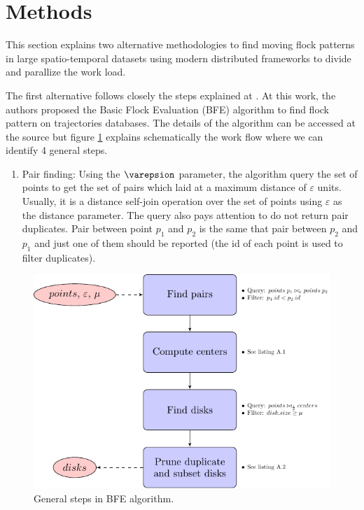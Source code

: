 \documentclass[journal,onecolumn]{IEEEtran}
\begin{document}
% 

\section{Methods}
This section explains two alternative methodologies to find moving flock patterns in large spatio-temporal datasets using modern distributed frameworks to divide and parallize the work load.

The first alternative follows closely the steps explained at \cite{vieira_-line_2009}.  At this work, the authors proposed the Basic Flock Evaluation (BFE) algorithm to find flock pattern on trajectories databases.  The details of the algorithm can be accessed at the source but figure \ref{fig:flowchart1} explains schematically the work flow where we can identify 4 general steps.

\begin{enumerate}
 \item Pair finding:  Using the $\varepsion$ parameter, the algorithm query the set of points to get the set of pairs which laid at a maximum distance of $\varepsilon$ units.  Usually, it is a distance self-join operation over the set of points using $\varepsilon$ as the distance parameter.  The query also pays attention to do not return pair duplicates.  Pair between point $p_1$ and $p_2$ is the same that pair between $p_2$ and $p_1$ and just one of them should be reported (the id of each point is used to filter duplicates).
\end{enumerate}



\begin{figure}
    \centering
    \includegraphics{figures/flowchart1}
    \caption{General steps in BFE algorithm.}\label{fig:flowchart1}
\end{figure}



\end{document}
